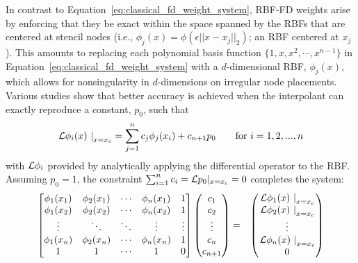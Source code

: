 \documentclass[11pt]{report}
\begin{document}
{In contrast to Equation~\ref{eq:classical_fd_weight_system}, RBF-FD weights arise by enforcing that they be exact within the space spanned by the RBFs that are centered at stencil nodes (i.e., $\phi_j(x) = \phi(\epsilon ||x-x_j||_2)$; an RBF centered at $x_j$). This amounts to replacing each polynomial basis function $\{1, x, x^2, \cdots, x^{n-1}\}$ in Equation~\ref{eq:classical_fd_weight_system} with a $d$-dimensional RBF, $\phi_j(x)$, which allows for nonsingularity in $d$-dimensions on irregular node placements. Various studies  \cite{WrightFornberg06,FornbergDriscoll02,FornbergLehto11,FlyerLehto11} show that better accuracy is achieved when the 
interpolant can exactly reproduce a constant, $p_0$, such that	\begin{align*}
	       \left. \mathcal{L}\phi_i(x) \ \right|_{x=x_c} = \sum_{j=1}^{n} c_j \phi_j(x_i) + c_{n+1} p_0 \ \ \ \ \ \ \textrm{for }i=1,2,...,n  
	\end{align*}
	with $\mathcal{L}\phi_i$ provided by analytically applying the differential operator to the RBF. Assuming $p_0 = 1$, the constraint $\sum_{i=1}^{n}c_i=\mathcal{L}p_0|_{x=x_{c}}=0$ completes the system: 
	\begin{eqnarray}        
          \begin{bmatrix} \phi_1(x_1) & \phi_2(x_1) & \cdots & \phi_n(x_{1}) & 1 \\ 
            \phi_1(x_2) & \phi_2(x_2) & \cdots & \phi_n(x_{2}) & 1\\ 
            \vdots & \ddots & \ddots & \vdots & \vdots \\ 
            \phi_{1}(x_n) & \phi_{2}(x_n) & \cdots & \phi_{n}(x_{n}) & 1 
            \\ 1 & 1 & \cdots & 1 & 0 \end{bmatrix} 
            \begin{pmatrix} c_1 \\ c_2 \\ \vdots \\ c_n \\ c_{n+1} \end{pmatrix} & = & \begin{pmatrix} \left.\diffop{\phi_1}(x)\ \right|_{x=x_c} \\  \left.\diffop{\phi_2}(x)\ \right|_{x=x_c} \\ \vdots \\  \left.\diffop{\phi_{n}}(x)\ \right|_{x=x_c} \\ 0 \end{pmatrix} \label{eq:rbffd_weight_system} \\

\end{eqnarray}}
\end{document}
